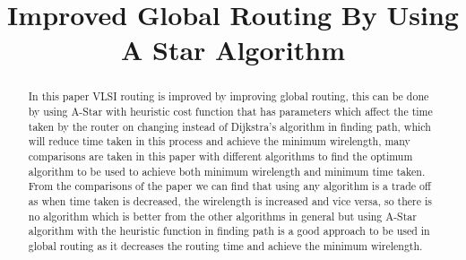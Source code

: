 \documentclass[conference]{IEEEtran}
\begin{document}

\title{Improved Global Routing By Using A Star Algorithm\\}


\author{
}


\maketitle


\begin{abstract}
    In this paper VLSI routing is improved by improving global routing, this can be done by using A-Star with heuristic cost function that has parameters which affect the time taken by the router on changing instead of Dijkstra's algorithm in finding path, which will reduce time taken in this process and achieve the minimum wirelength, many comparisons are taken in this paper with different algorithms to find the optimum algorithm to be used to achieve both minimum wirelength and minimum time taken. From the comparisons of the paper we can find that using any algorithm is a trade off as when time taken is decreased, the wirelength is increased and vice versa, so there is no algorithm which is better from the other algorithms in general but using A-Star algorithm with the heuristic function in finding path is a good approach to be used in global routing as it decreases the routing time and achieve the minimum wirelength.
\end{abstract}
\end{document}

